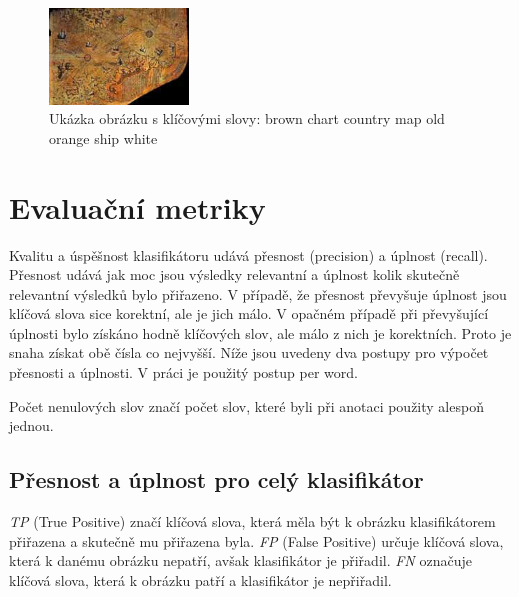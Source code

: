 \documentclass[czech,BP]{thesiskiv}
\begin{document}
\begin{figure}[h]
		\centering
		\includegraphics[width=140px]{./img/esp.jpg}	
		\caption{Ukázka obrázku s klíčovými slovy: brown chart country map old orange ship white}
\end{figure}



\chapter{Evaluační metriky}
\par Kvalitu a úspěšnost klasifikátoru udává přesnost (precision) a úplnost (recall). Přesnost udává jak moc jsou výsledky relevantní a úplnost kolik skutečně relevantní výsledků bylo přiřazeno. V případě, že přesnost převyšuje úplnost jsou klíčová slova sice korektní, ale je jich málo. V opačném případě při převyšující úplnosti bylo získáno hodně klíčových slov, ale málo z nich je korektních. Proto je snaha získat obě čísla co nejvyšší. Níže jsou uvedeny dva postupy pro výpočet přesnosti a úplnosti. V práci je použitý postup per word. \cite{Result_A_A}  
\par Počet nenulových slov značí počet slov, které byli při anotaci použity alespoň jednou. 

\section{Přesnost a úplnost pro celý klasifikátor}
\par \textit{TP} (True Positive) značí klíčová slova, která měla být k obrázku klasifikátorem přiřazena a skutečně mu přiřazena byla. \textit{FP} (False Positive) určuje klíčová slova, která k danému obrázku nepatří, avšak klasifikátor je přiřadil. \textit{FN} označuje klíčová slova, která k obrázku patří a klasifikátor je nepřiřadil. 
\end{document}
